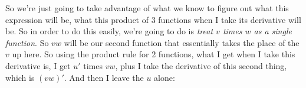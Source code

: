 \documentclass[pdftex, brazil, 12pt, twoside]{article}
\begin{document}
\begin{figure}[H]
  \begin{center}
  \end{center}
\end{figure}

So we're just going to take advantage
of what we know to figure out what this expression will be,
what this product of 3 functions when I take its derivative
will be.
So in order to do this easily, we're
going to do is \emph{treat $v$ times $w$ as a single function}.
So $vw$ will be our second function that essentially takes
the place of the $v$ up here.
So using the product rule for 2 functions, what
I get when I take this derivative is,
I get $u'$ times $vw$, plus I take the derivative
of this second thing, which is $(vw)'$.
And then I leave the $u$ alone:

\begin{figure}[H]
  \begin{center}
  \end{center}
\end{figure}
\end{document}

